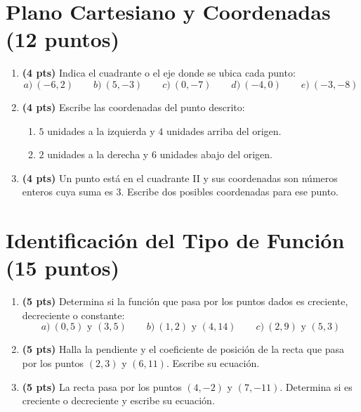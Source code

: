 \documentclass[12pt, letterpaper]{article}
\begin{document}
\newpage

\section{Plano Cartesiano y Coordenadas (12 puntos)}

\begin{enumerate}[leftmargin=*]
  \item \textbf{(4 pts)} Indica el cuadrante o el eje donde se ubica cada punto:
        \[
          a)\ (-6, 2) \qquad b)\ (5, -3) \qquad c)\ (0, -7) \qquad d)\ (-4, 0) \qquad e)\ (-3, -8)
        \]

  \item \textbf{(4 pts)} Escribe las coordenadas del punto descrito:
        \begin{enumerate}[label=\alph*)]
          \item $5$ unidades a la izquierda y $4$ unidades arriba del origen.
          \item $2$ unidades a la derecha y $6$ unidades abajo del origen.
        \end{enumerate}

  \item \textbf{(4 pts)} Un punto está en el cuadrante II y sus coordenadas son números enteros cuya suma es $3$. Escribe dos posibles coordenadas para ese punto.
\end{enumerate}

\newpage

\section{Identificación del Tipo de Función (15 puntos)}

\begin{enumerate}[leftmargin=*]
  \item \textbf{(5 pts)} Determina si la función que pasa por los puntos dados es creciente, decreciente o constante:
        \[
          a)\ (0,5) \text{ y } (3,5) \qquad b)\ (1,2) \text{ y } (4,14) \qquad c)\ (2,9) \text{ y } (5,3)
        \]

  \item \textbf{(5 pts)} Halla la pendiente y el coeficiente de posición de la recta que pasa por los puntos $(2,3)$ y $(6,11)$. Escribe su ecuación.

  \item \textbf{(5 pts)} La recta pasa por los puntos $(4,-2)$ y $(7,-11)$. Determina si es creciente o decreciente y escribe su ecuación.
\end{enumerate}
\end{document}
